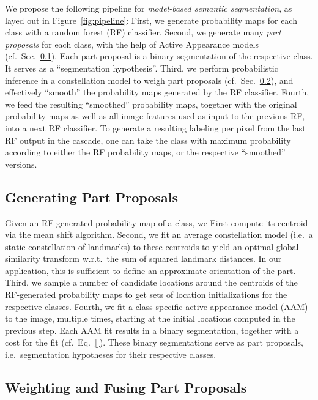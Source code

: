 \documentclass[10pt,twocolumn,letterpaper]{article}
\begin{document}
We propose the following pipeline for \emph{model-based semantic segmentation}, as layed out in Figure~\ref{fig:pipeline}: 
%
First, we generate probability maps for each class with a random forest (RF) classifier.
%
Second, we generate many \emph{part proposals} for each class, with the help of Active Appearance models (cf.\ Sec.\ \ref{subsec:hyps}). 
Each part proposal is a binary segmentation of the respective class. It serves as a ``segmentation hypothesis''. 
%
Third, we perform probabilistic inference in a constellation model to weigh part proposals (cf.\ Sec.\ \ref{subsec:weightsAndFusion}), and effectively ``smooth'' the probability maps generated by the RF classifier.  
%
Fourth, we feed the resulting ``smoothed'' probability maps, together with the original probability maps as well as all image features used as input to the previous RF, into a next RF classifier. 
%
To generate a resulting labeling per pixel from the last RF output in the cascade, one can take the class with maximum probability according to either the RF probability maps, or the respective ``smoothed'' versions. 


\subsection{Generating Part Proposals}
\label{subsec:hyps}
%
Given an RF-generated probability map of a class, we
First compute its centroid via the mean shift algorithm. 
%
Second, we fit an average constellation model (i.e.\ a static constellation of landmarks) to these centroids to yield an optimal global similarity transform w.r.t.\ the sum of squared landmark distances. In our application, this is sufficient to define an approximate orientation of the part. 
%
Third, we sample a number of candidate locations around the centroids of the RF-generated probability maps to get sets of location initializations for the respective classes. 
%
Fourth, we fit a class specific active appearance model (AAM) to the image, multiple times, starting at the initial locations computed in the previous step. 
%
Each AAM fit results in a binary segmentation, together with a cost for the fit (cf.\ Eq.\ \eqref{}). 
%
These binary segmentations serve as part proposals, i.e.\ segmentation hypotheses for their respective classes. 

\subsection{Weighting and Fusing Part Proposals}
\label{subsec:weightsAndFusion}
\end{document}
